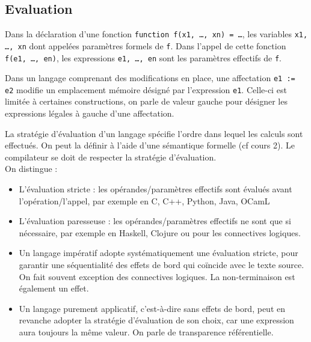 \documentclass{cours}
\begin{document}
\subsection{Evaluation}
\begin{definition}
    Dans la déclaration d'une fonction \texttt{function f(x1, \dots, xn) = \dots}, les variables \texttt{x1, \dots, xn} dont appelées paramètres formels de \texttt{f}. Dans l'appel de cette fonction \texttt{f(e1, \dots, en)}, les expressions \texttt{e1, \dots, en} sont les paramètres effectifs de \texttt{f}.
\end{definition}

\begin{definition}
    Dans un langage comprenant des modifications en place, une affectation \texttt{e1 := e2} modifie un emplacement mémoire désigné par l'expression \texttt{e1}. Celle-ci est limitée à certaines constructions, on parle de valeur gauche pour désigner les expressions légales à gauche d'une affectation.
\end{definition}

\begin{definition}
    La stratégie d'évaluation d'un langage spécifie l'ordre dans lequel les calculs sont effectués. On peut la définir à l'aide d'une sémantique formelle (cf cours 2). Le compilateur se doit de respecter la stratégie d'évaluation. \\
    On distingue :
    \begin{itemize}
        \item L'évaluation stricte : les opérandes/paramètres effectifs sont évalués avant l'opération/l'appel, par exemple en C, C++, Python, Java, OCamL
        \item L'évaluation paresseuse : les opérandes/paramètres effectifs ne sont que si nécessaire, par exemple en Haskell, Clojure ou pour les connectives logiques.
    \end{itemize}
\end{definition}

\begin{itemize}
    \item Un langage impératif adopte systématiquement une évaluation stricte, pour garantir une séquentialité des effets de bord qui coïncide avec le texte source. On fait souvent exception des connectives logiques. La non-terminaison est également un effet.
    \item Un langage purement applicatif, c'est-à-dire sans effets de bord, peut en revanche adopter la stratégie d'évaluation de son choix, car une expression aura toujours la même valeur. On parle de transparence référentielle.
\end{itemize}
\end{document}
